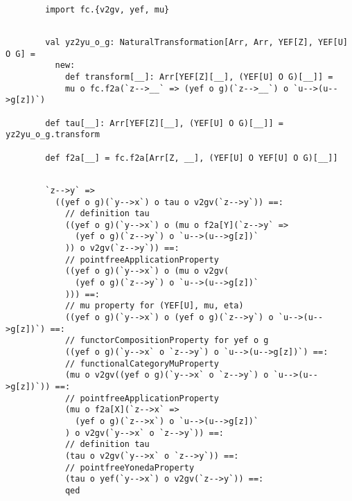 \documentclass[11pt]{article}
\def\edefn{\endgroup\par\pagebreak[2]\addvspace{\medskipamount}}
\let\ecode=\edefn
\begin{document}
\vspace{6pt}
\begin{mdframed}[backgroundcolor=lightgray!20] 
\begin{lstlisting}

        import fc.{v2gv, yef, mu}
\end{lstlisting}
\end{mdframed}
\vspace{6pt}
\begin{mdframed}[backgroundcolor=lightgray!20] 
\begin{lstlisting}

        val yz2yu_o_g: NaturalTransformation[Arr, Arr, YEF[Z], YEF[U] O G] =
          new:
            def transform[__]: Arr[YEF[Z][__], (YEF[U] O G)[__]] =
            mu o fc.f2a(`z-->__` => (yef o g)(`z-->__`) o `u-->(u-->g[z])`)

        def tau[__]: Arr[YEF[Z][__], (YEF[U] O G)[__]] = yz2yu_o_g.transform

        def f2a[__] = fc.f2a[Arr[Z, __], (YEF[U] O YEF[U] O G)[__]]
\end{lstlisting}
\end{mdframed}
\vspace{6pt}
\clearpage
\begin{mdframed}[backgroundcolor=lightgray!20] 
\begin{lstlisting}

        `z-->y` =>
          ((yef o g)(`y-->x`) o tau o v2gv(`z-->y`)) ==:
            // definition tau
            ((yef o g)(`y-->x`) o (mu o f2a[Y](`z-->y` =>
              (yef o g)(`z-->y`) o `u-->(u-->g[z])`
            )) o v2gv(`z-->y`)) ==:
            // pointfreeApplicationProperty
            ((yef o g)(`y-->x`) o (mu o v2gv(
              (yef o g)(`z-->y`) o `u-->(u-->g[z])`
            ))) ==:
            // mu property for (YEF[U], mu, eta)
            ((yef o g)(`y-->x`) o (yef o g)(`z-->y`) o `u-->(u-->g[z])`) ==:
            // functorCompositionProperty for yef o g
            ((yef o g)(`y-->x` o `z-->y`) o `u-->(u-->g[z])`) ==:
            // functionalCategoryMuProperty
            (mu o v2gv((yef o g)(`y-->x` o `z-->y`) o `u-->(u-->g[z])`)) ==:
            // pointfreeApplicationProperty
            (mu o f2a[X](`z-->x` =>
              (yef o g)(`z-->x`) o `u-->(u-->g[z])`
            ) o v2gv(`y-->x` o `z-->y`)) ==:
            // definition tau
            (tau o v2gv(`y-->x` o `z-->y`)) ==:
            // pointfreeYonedaProperty
            (tau o yef(`y-->x`) o v2gv(`z-->y`)) ==:
            qed
\end{lstlisting}
\end{mdframed}    
\ecode
\end{document}
